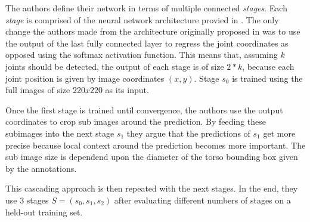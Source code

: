The authors define their network in terms of multiple connected \textit{stages}.
Each \textit{stage} is comprised of the neural network architecture provied in .
The only change the authors made from the architecture originally proposed in \cite{krizhevsky_imagenet_2012} was to use the output of the last fully connected layer to regress the joint coordinates as opposed using the softmax activation function.
This means that, assuming $k$ joints should be detected, the output of each stage is of size $2 * k$, because each joint position is given by image coordinates $(x, y)$.
Stage $s_0$ is trained using the full images of size $220 x 220$ as its input.

Once the first stage is trained until convergence, the authors use the output coordinates to crop sub images around the prediction.
By feeding these subimages into the next stage $s_1$ they argue that the predictions of $s_1$ get more precise because local context around the prediction becomes more important.
The sub image size is dependend upon the diameter of the torso bounding box given by the annotations.

This cascading approach is then repeated with the next stages.
In the end, they use $3$ stages $S = (s_0, s_1, s_2)$ after evaluating different numbers of stages on a held-out training set.

\begin{table}[]
    \centering
    \caption{One \textit{stage} of the DeepPose network. Architecture based on \cite{krizhevsky_imagenet_2012}.}
    \label{tab:deeppose-architecture}
\end{table}

